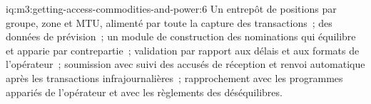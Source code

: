 \begin{solution}{iq:m3:getting-access-commodities-and-power:6}
Un entrepôt de positions par groupe, zone et MTU, alimenté par toute la capture des transactions~; des données de prévision~; un module de construction des nominations qui
équilibre et apparie par contrepartie~; validation par rapport aux délais et aux formats de l'opérateur~; soumission avec
suivi des accusés de réception et renvoi automatique après les transactions infrajournalières~; rapprochement avec les
programmes appariés de l'opérateur et avec les règlements des déséquilibres.
\end{solution}
